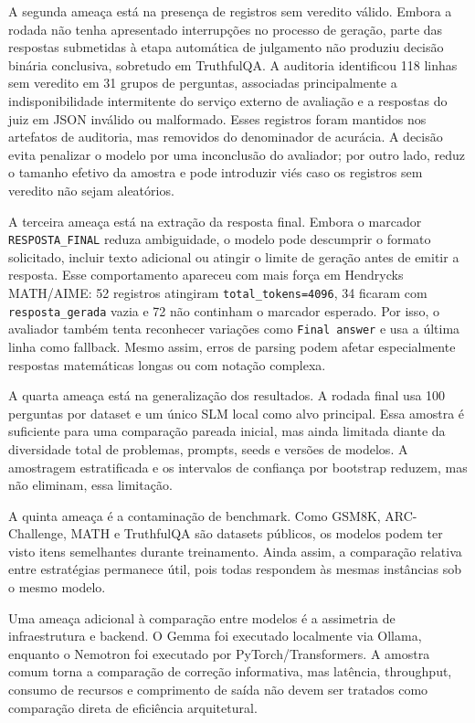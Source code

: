 \documentclass[12pt]{article}
\begin{document}
A segunda ameaça está na presença de registros sem veredito válido. Embora a rodada não tenha apresentado interrupções no processo de geração, parte das respostas submetidas à etapa automática de julgamento não produziu decisão binária conclusiva, sobretudo em TruthfulQA. A auditoria identificou 118 linhas sem veredito em 31 grupos de perguntas, associadas principalmente a indisponibilidade intermitente do serviço externo de avaliação e a respostas do juiz em JSON inválido ou malformado. Esses registros foram mantidos nos artefatos de auditoria, mas removidos do denominador de acurácia. A decisão evita penalizar o modelo por uma inconclusão do avaliador; por outro lado, reduz o tamanho efetivo da amostra e pode introduzir viés caso os registros sem veredito não sejam aleatórios.

A terceira ameaça está na extração da resposta final. Embora o marcador \texttt{RESPOSTA\_FINAL} reduza ambiguidade, o modelo pode descumprir o formato solicitado, incluir texto adicional ou atingir o limite de geração antes de emitir a resposta. Esse comportamento apareceu com mais força em Hendrycks MATH/AIME: 52 registros atingiram \texttt{total\_tokens=4096}, 34 ficaram com \texttt{resposta\_gerada} vazia e 72 não continham o marcador esperado. Por isso, o avaliador também tenta reconhecer variações como \texttt{Final answer} e usa a última linha como fallback. Mesmo assim, erros de parsing podem afetar especialmente respostas matemáticas longas ou com notação complexa.

A quarta ameaça está na generalização dos resultados. A rodada final usa 100 perguntas por dataset e um único SLM local como alvo principal. Essa amostra é suficiente para uma comparação pareada inicial, mas ainda limitada diante da diversidade total de problemas, prompts, seeds e versões de modelos. A amostragem estratificada e os intervalos de confiança por bootstrap reduzem, mas não eliminam, essa limitação.

A quinta ameaça é a contaminação de benchmark. Como GSM8K, ARC-Challenge, MATH e TruthfulQA são datasets públicos, os modelos podem ter visto itens semelhantes durante treinamento. Ainda assim, a comparação relativa entre estratégias permanece útil, pois todas respondem às mesmas instâncias sob o mesmo modelo.

Uma ameaça adicional à comparação entre modelos é a assimetria de infraestrutura e backend. O Gemma foi executado localmente via Ollama, enquanto o Nemotron foi executado por PyTorch/Transformers. A amostra comum torna a comparação de correção informativa, mas latência, throughput, consumo de recursos e comprimento de saída não devem ser tratados como comparação direta de eficiência arquitetural.
\end{document}
